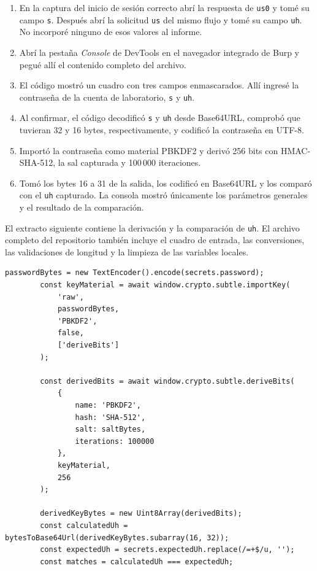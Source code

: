 \documentclass[letterpaper,12pt]{article}
\begin{document}
\begin{enumerate}
  \item En la captura del inicio de sesión correcto abrí la respuesta de \texttt{us0} y tomé
  su campo \texttt{s}. Después abrí la solicitud \texttt{us} del mismo flujo y tomé su campo
  \texttt{uh}. No incorporé ninguno de esos valores al informe.
  \item Abrí la pestaña \textit{Console} de DevTools en el navegador integrado de Burp y
  pegué allí el contenido completo del archivo.
  \item El código mostró un cuadro con tres campos enmascarados. Allí ingresé la contraseña
  de la cuenta de laboratorio, \texttt{s} y \texttt{uh}.
  \item Al confirmar, el código decodificó \texttt{s} y \texttt{uh} desde Base64URL,
  comprobó que tuvieran 32 y 16 bytes, respectivamente, y codificó la contraseña en UTF-8.
  \item Importó la contraseña como material PBKDF2 y derivó 256 bits con HMAC-SHA-512,
  la sal capturada y 100\,000 iteraciones.
  \item Tomó los bytes 16 a 31 de la salida, los codificó en Base64URL y los comparó con el
  \texttt{uh} capturado. La consola mostró únicamente los parámetros generales y el resultado
  de la comparación.
\end{enumerate}

El extracto siguiente contiene la derivación y la comparación de \texttt{uh}. El archivo
completo del repositorio también incluye el cuadro de entrada, las conversiones, las
validaciones de longitud y la limpieza de las variables locales.

\clearpage
\begin{lstlisting}[gobble=8,caption={Extracto literal del código ejecutado para derivar y comparar \texttt{uh}.},label={lst:pbkdf2}]
        passwordBytes = new TextEncoder().encode(secrets.password);
        const keyMaterial = await window.crypto.subtle.importKey(
            'raw',
            passwordBytes,
            'PBKDF2',
            false,
            ['deriveBits']
        );

        const derivedBits = await window.crypto.subtle.deriveBits(
            {
                name: 'PBKDF2',
                hash: 'SHA-512',
                salt: saltBytes,
                iterations: 100000
            },
            keyMaterial,
            256
        );

        derivedKeyBytes = new Uint8Array(derivedBits);
        const calculatedUh = bytesToBase64Url(derivedKeyBytes.subarray(16, 32));
        const expectedUh = secrets.expectedUh.replace(/=+$/u, '');
        const matches = calculatedUh === expectedUh;
\end{lstlisting}
\end{document}
